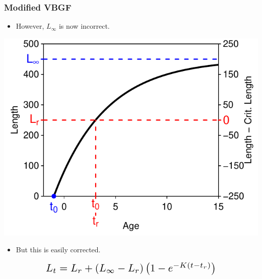 \documentclass[xcolor=dvipsnames]{beamer}\usepackage[]{graphicx}\usepackage[]{color}
\newenvironment{knitrout}{}{} %
\newcommand*{\Scale}[2][4]{\scalebox{#1}{\ensuremath{#2}}}%
\begin{document}
\begin{frame}[fragile, t]
\frametitle{Modified VBGF}
\begin{itemize}
  \item However, $L_{\infty}$ is now incorrect.
\end{itemize}

\begin{knitrout}\footnotesize
{}\color{fgcolor}

{\centering \includegraphics[width=.5\linewidth]{Figs/redefine6-1} 

}



\end{knitrout}
\pause
\begin{itemize}
  \item But this is easily corrected.
\end{itemize}

\[\Scale[1.5]{ L_{t} = L_{r} + \left(L_{\infty}-L_{r}\right)\left(1-e^{-K(t-t_{r})}\right) }\]

\end{frame}
\end{document}
